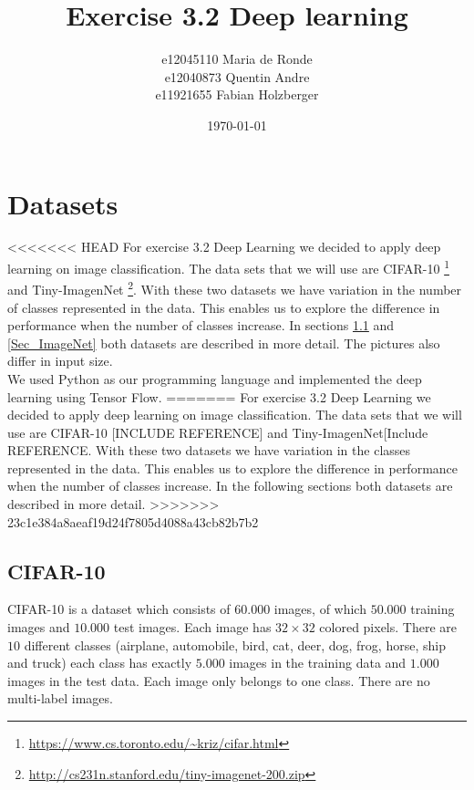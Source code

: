 \documentclass[11pt]{article}
\title{Exercise 3.2 Deep learning}
\author{e12045110 Maria de Ronde \\ e12040873  Quentin Andre  \\ e11921655 Fabian Holzberger}
\date{\today}
\begin{document}
\graphicspath{{./pictures/}}
\maketitle

%
\section{Datasets}
<<<<<<< HEAD
For exercise 3.2 Deep Learning we decided to apply deep learning on image classification. The data sets that we will use are CIFAR-10 \footnote{\url{https://www.cs.toronto.edu/~kriz/cifar.html}} and Tiny-ImagenNet  \footnote{\url{http://cs231n.stanford.edu/tiny-imagenet-200.zip}}. With these two datasets we have variation in the number of classes represented in the data. This  enables us to explore the difference in performance when the number of classes increase. In sections \ref{Sec_Cifar-10} and \ref{Sec_ImageNet} both datasets are described in more detail. The pictures also differ in input size.\\
We used Python as our programming language and implemented the deep learning using Tensor Flow. 
=======
For exercise 3.2 Deep Learning we decided to apply deep learning on image classification. The data sets that we will use are CIFAR-10 [INCLUDE REFERENCE] and Tiny-ImagenNet[Include REFERENCE. With these two datasets we have variation in the classes represented in the data. This  enables us to explore the difference in performance when the number of classes increase. In the following sections both datasets are described in more detail. 
>>>>>>> 23c1e384a8aeaf19d24f7805d4088a43cb82b7b2

\subsection{CIFAR-10}\label{Sec_Cifar-10}
CIFAR-10 is a dataset which consists of $60.000$ images, of which $50.000$ training images and $10.000$ test images. Each image has $32\times32$ colored pixels.
There are $10$ different classes (airplane, automobile, bird, cat, deer, dog, frog, horse, ship and truck) each class has exactly $5.000$ images in the training data and $1.000$ images in the test data. Each image only belongs to one class. There are no multi-label images. 
\end{document}
